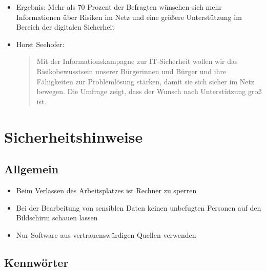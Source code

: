 \begin{frame}
{{\begin{itemize}
    \item Ergebnis: Mehr als 70 Prozent der Befragten wünschen sich mehr In\-form\-ation\-en über Ri\-si\-ken im Netz und eine größere Unterstützung im Bereich der digitalen Sicherheit
    \item Horst Seehofer:
    \begin{quote}
     \glqq Mit der Informationskampagne zur IT-Sicherheit wollen wir das Risikobewusstsein unserer Bürgerinnen und Bürger und ihre Fähigkeiten zur Problemlösung stärken, damit sie sich sicher im Netz bewegen. Die Umfrage zeigt, dass der Wunsch nach Unterstützung groß ist.\grqq
    \end{quote}
  \end{itemize}
}
}
\end{frame}

\section{Sicherheitshinweise}

\subsection{Allgemein}

\begin{frame}
\begin{itemize}
	\item Beim Verlassen des Arbeitsplatzes ist Rechner zu sperren
	\item Bei der Bearbeitung von sensiblen Daten keinen unbefugten Personen auf den Bildschirm schauen lassen
	\item Nur Software aus vertrauenswürdigen Quellen verwenden
\end{itemize}
\end{frame}

\subsection{Kennwörter}



